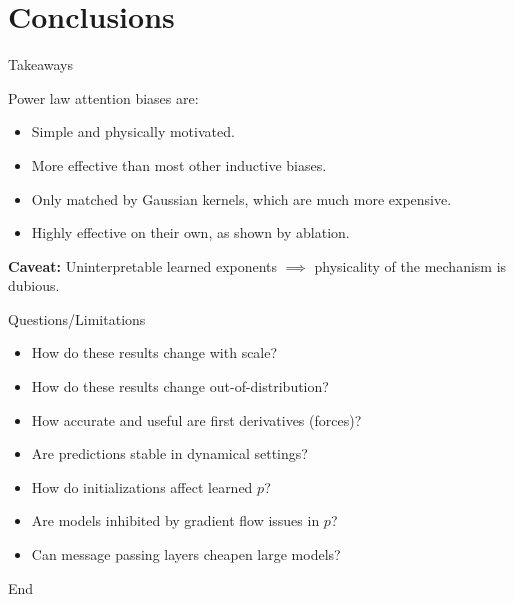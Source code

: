 \documentclass{beamer}
\begin{document}
\section{Conclusions}

\begin{frame}{Takeaways}

Power law attention biases are:
\begin{itemize}
    \item Simple and physically motivated.
    \item More effective than most other inductive biases. 
    \item Only matched by Gaussian kernels, which are much more expensive. 
    \item Highly effective on their own, as shown by ablation. 
\end{itemize}

\textbf{Caveat:} Uninterpretable learned exponents $\implies$ physicality of the mechanism is dubious. 

\end{frame}

\begin{frame}{Questions/Limitations}

\begin{itemize}
    \item How do these results change with scale? 
    \item How do these results change out-of-distribution? 
    \item How accurate and useful are first derivatives (forces)?
    \item Are predictions stable in dynamical settings?
    \item How do initializations affect learned $p$?
    \item Are models inhibited by gradient flow issues in $p$?
    \item Can message passing layers cheapen large models? 
\end{itemize}

\end{frame}

\begin{frame}
\centering
End
\end{frame}
\end{document}
